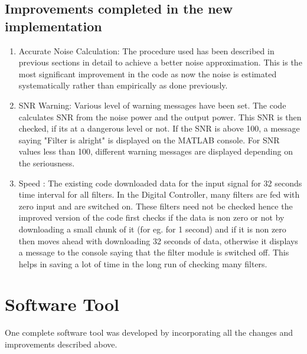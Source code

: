 \documentclass[colorlinks=true,pdfstartview=FitV,linkcolor=blue,
            citecolor=red,urlcolor=magenta]{ligodoc}
\begin{document}
	\subsection{Improvements completed in the new implementation} 
	\begin{enumerate}
	\item Accurate Noise Calculation: The procedure used has been described in previous sections in detail to achieve a better noise approximation. This is the most significant improvement in the code as now the noise is estimated systematically rather than empirically as done previously. 
	\item SNR Warning: Various level of warning messages have been set. The code calculates SNR from the noise power and the output power. This SNR is then checked, if its at a dangerous level or not. If the SNR is above 100, a message saying "Filter is alright" is displayed on the MATLAB console. For SNR values less than 100, different warning messages are displayed depending on the seriousness. 
	\item Speed : The existing code downloaded data for the input signal for 32 seconds time interval for all filters. In the Digital Controller, many filters are fed with zero input and are switched on. These filters need not be checked hence the improved version of the code first checks if the data is non zero or not by downloading a small chunk of it (for eg. for 1 second) and if it is non zero then moves ahead with downloading 32 seconds of data, otherwise it displays a message to the console saying that the filter module is switched off. This helps in saving a lot of time in the long run of checking many filters.  
	\end{enumerate}
\section{Software Tool}
	One complete software tool was developed by incorporating all the changes and improvements described above. 
\end{document}
